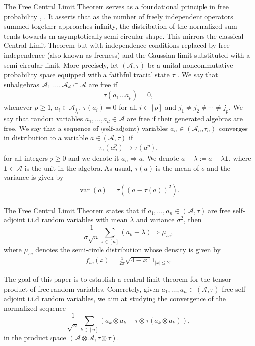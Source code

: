 \documentclass[12pt,reqno]{amsart}
\theoremstyle{plain}
\newcommand{\1}{\mathbf{1}}
\newcommand{\var}{\operatorname{var}}
\newcommand{\A}{\mathcal{A}}
\begin{document}
The Free Central Limit Theorem serves as a foundational principle in free probability \cite{voiculescu1985symmetries}, \cite[Lecture 8]{nica2006lectures}. It asserts that as the number of freely independent operators summed together approaches infinity, the distribution of the normalized sum tends towards an asymptotically semi-circular shape. This mirrors the classical Central Limit Theorem but with independence conditions replaced by free independence (also known as freeness) and the Gaussian limit substituted with a semi-circular limit. More precisely, let $(\A,\tau)$ be a unital noncommutative probability space equipped with a faithful tracial state $\tau$ \cite[Lecture 1]{nica2006lectures}. We say that subalgebras $\mathcal{A}_1,\ldots, \mathcal{A}_d\subset \A$ are free if 
\begin{align*}
    \tau(a_1\ldots a_p)=0,
\end{align*}
whenever $p \ge 1$, $a_i \in \mathcal{A}_{j_i}$, $\tau(a_i)=0$ for all $i\in[p]$ and $j_1 \ne j_2 \ne \cdots \ne j_p$. We say that random variables $a_1,\ldots,a_d \in \mathcal{A}$ are free if their generated algebras are free. 
We say that a sequence of (self-adjoint) variables $a_n \in (\A_n,\tau_n)$ converges in distribution to a variable $a \in (\A,\tau)$ if
\begin{align*}
    \tau_n(a_n^p) \to \tau(a^p),
\end{align*}
for all integers $p \ge 0$ and we denote it $a_n \Rightarrow a$. We denote $a-\lambda:=a-\lambda \1$, where $\1 \in \A$ is the unit in the algebra. As usual, $\tau(a)$ is the mean of $a$ and the variance is given by
\begin{align*}
    \var(a)=\tau((a-\tau(a))^2).
\end{align*}

The Free Central Limit Theorem states that if $a_1,\ldots,a_n\in(\A,\tau)$ are free self-adjoint i.i.d random variables with mean $\lambda$ and variance $\sigma^2$, then 
$$
\frac{1}{\sigma\sqrt{n}}\sum_{k\in[n]} (a_k-\lambda) \Rightarrow \mu_{sc},
$$
where $\mu_{sc}$ denotes the semi-circle distribution whose density is given by 
\begin{align*}\label{semicircular density}
    f_{sc}(x)=\frac{1}{2\pi}\sqrt{4-x^2} \mathbf{1}_{|x| \le 2}.
\end{align*}

The goal of this paper is to establish a central limit theorem for the tensor product of free random variables. Concretely, given $a_1,\ldots,a_n\in(\A,\tau)$ free self-adjoint i.i.d random variables, we aim at studying the convergence of the normalized sequence
\begin{equation}\label{eq: intro-tensor-setting}
       \frac{1}{\sqrt{n}}\sum_{k \in [n]}\left(a_k \otimes a_k-\tau\otimes \tau(a_k\otimes a_k)\right),
\end{equation}
in the product space $(\A\otimes \A,\tau\otimes \tau)$. 
\end{document}

